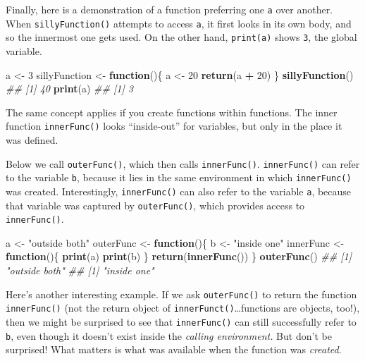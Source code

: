 \documentclass[12pt,krantz2]{krantz}
\makeatletter
\newenvironment{Shaded}{\begin{snugshade}}{\end{snugshade}}
\newcommand{\CommentTok}[1]{\textcolor[rgb]{0.37,0.37,0.37}{\textit{#1}}}
\newcommand{\ControlFlowTok}[1]{\textcolor[rgb]{0.27,0.27,0.27}{\textbf{#1}}}
\newcommand{\DecValTok}[1]{\textcolor[rgb]{0.06,0.06,0.06}{#1}}
\newcommand{\KeywordTok}[1]{\textcolor[rgb]{0.27,0.27,0.27}{\textbf{#1}}}
\newcommand{\NormalTok}[1]{#1}
\newcommand{\OperatorTok}[1]{\textcolor[rgb]{0.43,0.43,0.43}{\textbf{#1}}}
\newcommand{\StringTok}[1]{\textcolor[rgb]{0.5,0.5,0.5}{#1}}
\newenvironment{kframe}{%
\medskip{}
\setlength{\fboxsep}{.8em}
 \def\at@end@of@kframe{}%
 \ifinner\ifhmode%
  \def\at@end@of@kframe{\end{minipage}}%
  \begin{minipage}{\columnwidth}%
 \fi\fi%
 \def\FrameCommand##1{\hskip\@totalleftmargin \hskip-\fboxsep
 \colorbox{shadecolor}{##1}\hskip-\fboxsep
     \hskip-\linewidth \hskip-\@totalleftmargin \hskip\columnwidth}%
 \MakeFramed {\advance\hsize-\width
   \@totalleftmargin\z@ \linewidth\hsize
   \@setminipage}}%
 {\par\unskip\endMakeFramed%
 \at@end@of@kframe}
\renewenvironment{Shaded}{\begin{kframe}}{\end{kframe}}
\makeatother
\begin{document}
Finally, here is a demonstration of a function preferring one \texttt{a} over another. When \texttt{sillyFunction()} attempts to access \texttt{a}, it first looks in its own body, and so the innermost one gets used. On the other hand, \texttt{print(a)} shows \texttt{3}, the global variable.

\begin{Shaded}
\begin{Highlighting}[]
\NormalTok{a <-}\StringTok{ }\DecValTok{3}
\NormalTok{sillyFunction <-}\StringTok{ }\ControlFlowTok{function}\NormalTok{()\{}
\NormalTok{  a <-}\StringTok{ }\DecValTok{20}
  \KeywordTok{return}\NormalTok{(a }\OperatorTok{+}\StringTok{ }\DecValTok{20}\NormalTok{) }
\NormalTok{\}}
\KeywordTok{sillyFunction}\NormalTok{()}
\CommentTok{## [1] 40}
\KeywordTok{print}\NormalTok{(a)}
\CommentTok{## [1] 3}
\end{Highlighting}
\end{Shaded}

The same concept applies if you create functions within functions. The inner function \texttt{innerFunc()} looks ``inside-out'' for variables, but only in the place it was defined.

Below we call \texttt{outerFunc()}, which then calls \texttt{innerFunc()}. \texttt{innerFunc()} can refer to the variable \texttt{b}, because it lies in the same environment in which \texttt{innerFunc()} was created. Interestingly, \texttt{innerFunc()} can also refer to the variable \texttt{a}, because that variable was captured by \texttt{outerFunc()}, which provides access to \texttt{innerFunc()}.

\begin{Shaded}
\begin{Highlighting}[]
\NormalTok{a <-}\StringTok{ "outside both"}
\NormalTok{outerFunc <-}\StringTok{ }\ControlFlowTok{function}\NormalTok{()\{}
\NormalTok{  b <-}\StringTok{ "inside one"}
\NormalTok{  innerFunc <-}\StringTok{ }\ControlFlowTok{function}\NormalTok{()\{}
    \KeywordTok{print}\NormalTok{(a) }
    \KeywordTok{print}\NormalTok{(b)}
\NormalTok{  \}}
  \KeywordTok{return}\NormalTok{(}\KeywordTok{innerFunc}\NormalTok{())}
\NormalTok{\}}
\KeywordTok{outerFunc}\NormalTok{()}
\CommentTok{## [1] "outside both"}
\CommentTok{## [1] "inside one"}
\end{Highlighting}
\end{Shaded}

Here's another interesting example. If we ask \texttt{outerFunc()} to return the function \texttt{innerFunc()} (not the return object of \texttt{innerFunct()}\ldots{}functions are objects, too!), then we might be surprised to see that \texttt{innerFunc()} can still successfully refer to \texttt{b}, even though it doesn't exist inside the \emph{calling environment.} But don't be surprised! What matters is what was available when the function was \emph{created}.
\end{document}
